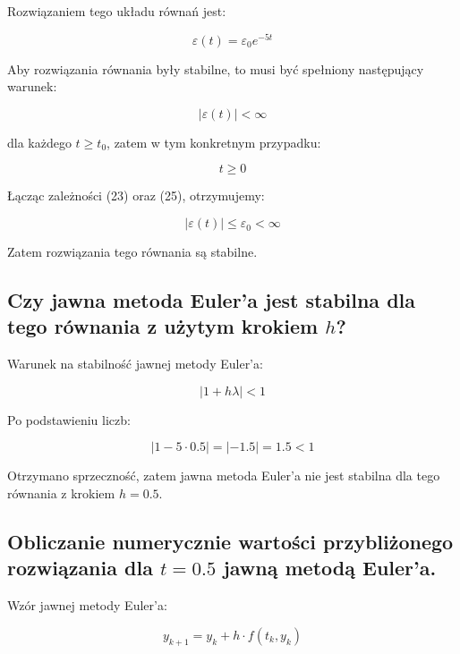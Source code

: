 \documentclass{article}
\begin{document}
	Rozwiązaniem tego układu równań jest:

	\begin{equation}
		\varepsilon (t) = \varepsilon_0 e^{-5t}
	\end{equation}

	Aby rozwiązania równania były stabilne, to musi być spełniony następujący warunek:

	\begin{equation}
		| \varepsilon (t) | < \infty
	\end{equation}

	dla każdego $t \geq t_0$, zatem w tym konkretnym przypadku:

	\begin{equation}
		t \geq 0
	\end{equation}

	Łącząc zależności (23) oraz (25), otrzymujemy:

	\begin{equation}
		| \varepsilon (t) | \leq \varepsilon_0 < \infty
	\end{equation}

	Zatem rozwiązania tego równania są stabilne.


	\subsection*{Czy jawna metoda Euler'a jest stabilna dla tego równania z użytym krokiem $h$?}

	Warunek na stabilność jawnej metody Euler'a:

	\begin{equation}
		|1+h\lambda| < 1
	\end{equation}

	Po podstawieniu liczb:

	\begin{equation}
		|1-5 \cdot 0.5| = |-1.5| = 1.5 < 1
	\end{equation}

	Otrzymano sprzeczność, zatem jawna metoda Euler'a nie jest stabilna dla tego równania z krokiem $h = 0.5$.

	\subsection*{Obliczanie numerycznie wartości przybliżonego rozwiązania dla $t = 0.5$ jawną metodą Euler'a.}

	Wzór jawnej metody Euler'a:

	\begin{equation}
		y_{k+1} = y_k + h \cdot f(t_k, y_k)
	\end{equation}
\end{document}
